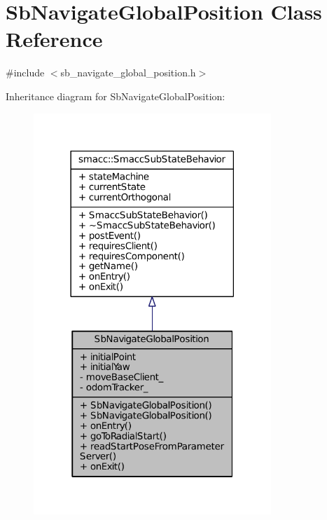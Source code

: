 \hypertarget{classSbNavigateGlobalPosition}{}\section{Sb\+Navigate\+Global\+Position Class Reference}
\label{classSbNavigateGlobalPosition}


{\ttfamily \#include $<$sb\+\_\+navigate\+\_\+global\+\_\+position.\+h$>$}



Inheritance diagram for Sb\+Navigate\+Global\+Position\+:
\nopagebreak
\begin{figure}[H]
\begin{center}
\leavevmode
\includegraphics[width=254pt]{classSbNavigateGlobalPosition__inherit__graph}
\end{center}
\end{figure}


